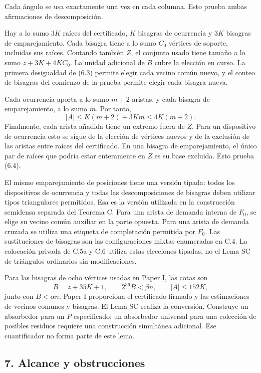 \documentclass[spanish,11pt,a4paper]{article}
\begin{document}
Cada ángulo se usa exactamente una vez en cada columna. Esto prueba ambas afirmaciones de descomposición.

Hay a lo sumo \(3K\) raíces del certificado, \(K\) bisagras de ocurrencia y \(3K\) bisagras de emparejamiento. Cada bisagra tiene a lo sumo \(C_0\) vértices de soporte, incluidas sus raíces. Contando también \(Z\), el conjunto usado tiene tamaño a lo sumo \(z+3K+4KC_0\). La unidad adicional de \(B\) cubre la elección en curso. La primera desigualdad de (6.3) permite elegir cada vecino común nuevo, y el conteo de bisagras del comienzo de la prueba permite elegir cada bisagra nueva.

Cada ocurrencia aporta a lo sumo \(m+2\) aristas, y cada bisagra de emparejamiento, a lo sumo \(m\). Por tanto, \[|A|\le K(m+2)+3Km\le4K(m+2).\] Finalmente, cada arista añadida tiene un extremo fuera de \(Z\). Para un dispositivo de ocurrencia esto se sigue de la elección de vértices nuevos y de la exclusión de las aristas entre raíces del certificado. En una bisagra de emparejamiento, el único par de raíces que podría estar enteramente en \(Z\) es su base excluida. Esto prueba (6.4).

El mismo emparejamiento de posiciones tiene una versión tipada: todos los dispositivos de ocurrencia y todas las descomposiciones de bisagras deben utilizar tipos triangulares permitidos. Esa es la versión utilizada en la construcción semidensa separada del Teorema C. Para una arista de demanda interna de \(F_0\), se elige su vecino común auxiliar en la parte opuesta. Para una arista de demanda cruzada se utiliza una etiqueta de completación permitida por \(F_0\). Las sustituciones de bisagras son las configuraciones mixtas enumeradas en C.4. La colocación privada de C.5a y C.6 utiliza estas elecciones tipadas, no el Lema SC de triángulos ordinarios sin modificaciones.

Para las bisagras de ocho vértices usadas en Paper I, las cotas son \[B=z+35K+1,\qquad 2^{36}B<\beta n,\qquad |A|\le152K,
\tag{6.7}\] junto con \(B<\alpha n\). Paper I proporciona el certificado firmado y las estimaciones de vecinos comunes y bisagras. El Lema SC realiza la conversión. Construye un absorbedor para un \(P\) especificado; un absorbedor universal para una colección de posibles residuos requiere una construcción simultánea adicional. Ese cuantificador no forma parte de este lema.

\subsection{7. Alcance y obstrucciones}\label{alcance-y-obstrucciones}
\end{document}
